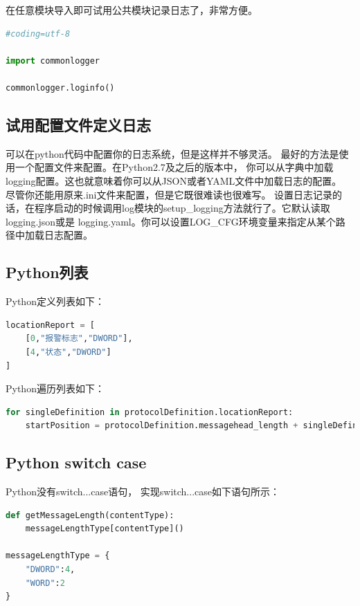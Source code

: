 \documentclass{book}
\begin{document}
在任意模块导入即可试用公共模块记录日志了，非常方便。

\begin{lstlisting}[language=Python]
#coding=utf-8

import commonlogger

commonlogger.loginfo()
\end{lstlisting}

\subsection{试用配置文件定义日志}

可以在python代码中配置你的日志系统，但是这样并不够灵活。
最好的方法是使用一个配置文件来配置。在Python2.7及之后的版本中，
你可以从字典中加载logging配置。这也就意味着你可以从JSON或者YAML文件中加载日志的配置。
尽管你还能用原来.ini文件来配置，但是它既很难读也很难写。
设置日志记录的话，在程序启动的时候调用log模块的setup\_logging方法就行了。它默认读取logging.json或是 logging.yaml。你可以设置LOG\_CFG环境变量来指定从某个路径中加载日志配置。

\subsection{Python列表}

Python定义列表如下：

\begin{lstlisting}[language=Python]
locationReport = [
	[0,"报警标志","DWORD"],
	[4,"状态","DWORD"]
]
\end{lstlisting}

Python遍历列表如下：

\begin{lstlisting}[language=Python]
for singleDefinition in protocolDefinition.locationReport:
	startPosition = protocolDefinition.messagehead_length + singleDefinition[0]
\end{lstlisting}

\subsection{Python switch case}

Python没有switch...case语句，
实现switch...case如下语句所示：

\begin{lstlisting}[language=Python]
def getMessageLength(contentType):
	messageLengthType[contentType]()

messageLengthType = {
	"DWORD":4,
	"WORD":2    
}
\end{lstlisting}
\end{document}
